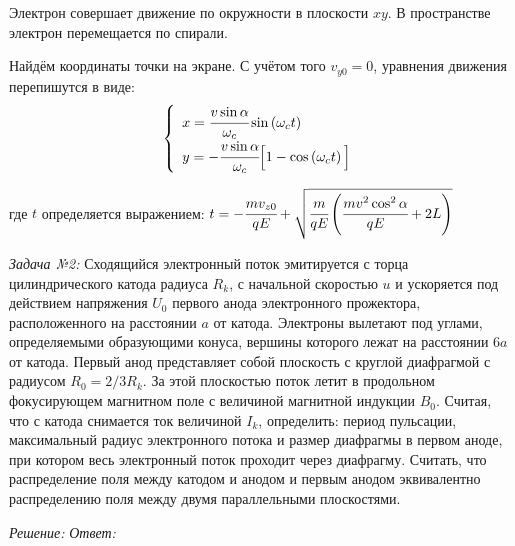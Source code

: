 Электрон совершает движение по окружности в плоскости \( xy \). 
В пространстве электрон перемещается по спирали.

Найдём координаты точки на экране. С учётом того \( v_{y0} = 0 \), уравнения 
движения перепишутся в виде:
\[
	\left\{ \begin{array}{ll}
		x = \cfrac{v\sin\alpha}{\omega_c}\sin\left( \omega_c t \right) \\
		y = -\cfrac{v\sin\alpha}{\omega_c}
			\Big[ 1 - \cos\left( \omega_c t \right) \Big]
	\end{array} \right.
\]

где \( t \) определяется выражением:
\(
	t = -\cfrac{mv_{z0}}{qE} + 
	\sqrt{ \cfrac{m}{qE}\left( \cfrac{mv^2\cos^2\alpha}{qE} + 2L \right)} 
\)

\pagebreak


\emph{Задача №2:} Сходящийся электронный поток эмитируется с торца 
цилиндрического катода радиуса \( R_k \), с начальной скоростью \( u \) и 
ускоряется под действием напряжения \( U_0 \) первого анода электронного 
прожектора, расположенного на расстоянии \( a \) от катода. Электроны вылетают 
под углами, определяемыми образующими конуса, вершины которого лежат на 
расстоянии \( 6a \) от катода. Первый анод представляет собой плоскость с 
круглой диафрагмой с радиусом \( R_0 = 2/3 R_k \). За этой плоскостью поток 
летит в продольном фокусирующем магнитном поле с величиной магнитной индукции 
\( B_0 \). Считая, что с катода снимается ток величиной \( I_k \), определить: 
период пульсации, максимальный радиус электронного потока и размер диафрагмы в 
первом аноде, при котором весь электронный поток проходит через диафрагму. 
Считать, что распределение поля между катодом и анодом и первым анодом 
эквивалентно распределению поля между двумя параллельными плоскостями.

\emph{Решение:}
\emph{Ответ:}


